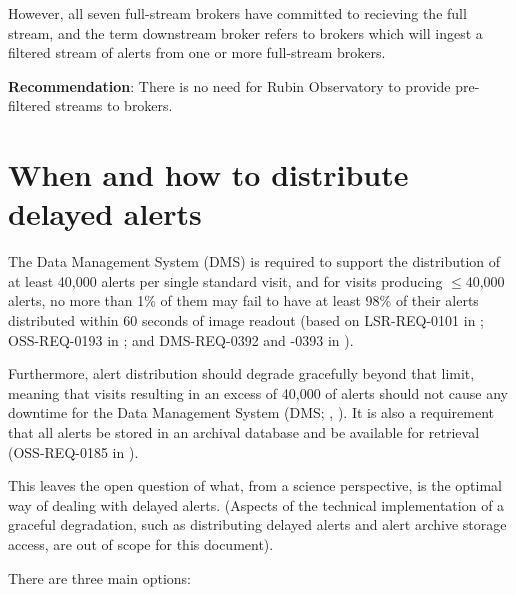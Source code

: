 \documentclass[DM,authoryear,toc]{lsstdoc}
\begin{document}
However, all seven full-stream brokers have committed to recieving the full stream, and the term downstream broker refers to 
brokers which will ingest a filtered stream of alerts from one or more full-stream brokers.

\textbf{Recommendation}: There is no need for Rubin Observatory to provide pre-filtered streams to brokers.


\section{When and how to distribute delayed alerts}\label{sec:delayed}

The Data Management System (DMS) is required to support the distribution of at least 40,000 alerts per single standard visit, 
and for visits producing $\leq$40,000 alerts, no more than 1\% of them may fail to have at least 98\% of their alerts distributed 
within 60 seconds of image readout (based on LSR-REQ-0101 in ; OSS-REQ-0193 in ; 
and DMS-REQ-0392 and -0393 in ).

Furthermore, alert distribution should degrade gracefully beyond that limit, meaning that visits resulting in an excess of 
40,000 of alerts should not cause any downtime for the Data Management System (DMS; , ).
It is also a requirement that all alerts be stored in an archival database and be available for retrieval 
(OSS-REQ-0185 in ).

This leaves the open question of what, from a science perspective, is the optimal way of dealing with delayed alerts.
(Aspects of the technical implementation of a graceful degradation, such as distributing delayed alerts and alert archive 
storage access, are out of scope for this document).

There are three main options:
\end{document}
